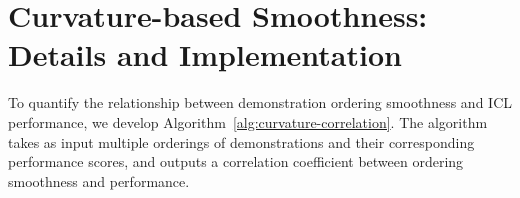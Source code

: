 \documentclass{llmxive}
\begin{document}
\begin{table}[!htbp]
\centering
\small
\setlength{\tabcolsep}{4pt}
\caption{CoT-ICL generated from stronger LLMs versus self-generated demonstrations across five random ordering seeds. Values report $\mu \pm \sigma$.}
\label{tab:stat_stronger_vs_self}
\end{table}

\section{Curvature-based Smoothness: Details and Implementation}
\label{sec:algocurvature}

To quantify the relationship between demonstration ordering smoothness and ICL performance, we develop Algorithm~\ref{alg:curvature-correlation}. The algorithm takes as input multiple orderings of demonstrations and their corresponding performance scores, and outputs a correlation coefficient between ordering smoothness and performance.
\end{document}
